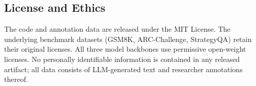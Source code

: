 \subsection{License and Ethics}

The code and annotation data are released under the MIT License. The underlying benchmark datasets (GSM8K, ARC-Challenge, StrategyQA) retain their original licenses. All three model backbones use permissive open-weight licenses. No personally identifiable information is contained in any released artifact; all data consists of LLM-generated text and researcher annotations thereof.
